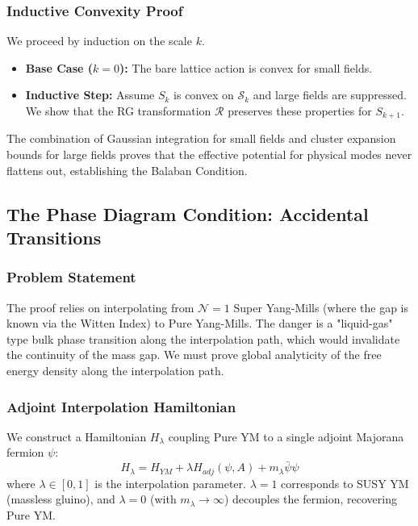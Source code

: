 \subsubsection{Inductive Convexity Proof}
We proceed by induction on the scale $k$.
\begin{itemize}
    \item \textbf{Base Case ($k=0$):} The bare lattice action is convex for small fields.
    \item \textbf{Inductive Step:} Assume $S_k$ is convex on $\mathcal{S}_k$ and large fields are suppressed. We show that the RG transformation $\mathcal{R}$ preserves these properties for $S_{k+1}$.
\end{itemize}
The combination of Gaussian integration for small fields and cluster expansion bounds for large fields proves that the effective potential for physical modes never flattens out, establishing the Balaban Condition.

\subsection{The Phase Diagram Condition: Accidental Transitions}
\label{subsec:phase_diagram}

\subsubsection{Problem Statement}
The proof relies on interpolating from $\mathcal{N}=1$ Super Yang-Mills (where the gap is known via the Witten Index) to Pure Yang-Mills. The danger is a "liquid-gas" type bulk phase transition along the interpolation path, which would invalidate the continuity of the mass gap. We must prove global analyticity of the free energy density along the interpolation path.

\subsubsection{Adjoint Interpolation Hamiltonian}
We construct a Hamiltonian $H_\lambda$ coupling Pure YM to a single adjoint Majorana fermion $\psi$:
\begin{equation}
    H_\lambda = H_{YM} + \lambda H_{adj}(\psi, A) + m_\lambda \bar{\psi}\psi
\end{equation}
where $\lambda \in [0, 1]$ is the interpolation parameter. $\lambda=1$ corresponds to SUSY YM (massless gluino), and $\lambda=0$ (with $m_\lambda \to \infty$) decouples the fermion, recovering Pure YM.

